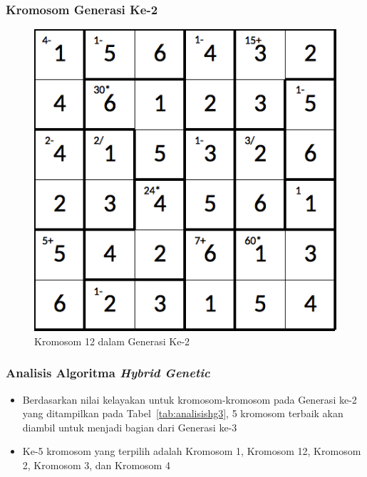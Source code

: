 \documentclass{beamer}
\begin{document}
\note{

}

\begin{frame}
\frametitle{Kromosom Generasi Ke-2}
\begin{figure}
\centering
\captionsetup{justification=centering}
\includegraphics[scale=0.333]{Gambar/hybridgenetic/Generation2Chromosome12}
\caption[Kromosom 12 dalam Generasi Ke-2]{Kromosom 12 dalam Generasi Ke-2}
\label{fig:analisisg2k12}
\end{figure}
\end{frame}

\note{

}

\begin{frame}
\frametitle{Analisis Algoritma \textit{Hybrid Genetic}}
\begin{itemize}
\item Berdasarkan nilai kelayakan untuk kromosom-kromosom pada Generasi ke-2 yang ditampilkan pada Tabel~\ref{tab:analisishg3}, 5 kromosom terbaik akan diambil untuk menjadi bagian dari Generasi ke-3
\item Ke-5 kromosom yang terpilih adalah Kromosom 1, Kromosom 12, Kromosom 2, Kromosom 3, dan Kromosom 4
\end{itemize}
\end{frame}

\end{document}
